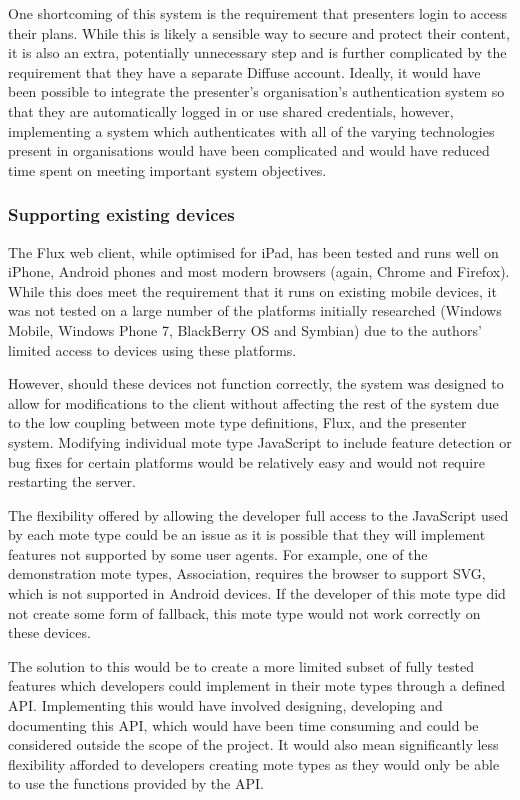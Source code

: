 \documentclass[a4papert,11pt,notitlepage]{article}
\begin{document}
One shortcoming of this system is the requirement that presenters login to access their plans. While this is likely a sensible way to secure and protect their content, it is also an extra, potentially unnecessary step and is further complicated by the requirement that they have a separate Diffuse account. Ideally, it would have been possible to integrate the presenter's organisation's authentication system so that they are automatically logged in or use shared credentials, however, implementing a system which authenticates with all of the varying technologies present in organisations would have been complicated and would have reduced time spent on meeting important system objectives.

\subsubsection{Supporting existing devices}
\label{sec:supportexistingdevices}
The Flux web client, while optimised for iPad, has been tested and runs well on iPhone, Android phones and most modern browsers (again, Chrome and Firefox). While this does meet the requirement that it runs on existing mobile devices, it was not tested on a large number of the platforms initially researched (Windows Mobile, Windows Phone 7, BlackBerry OS and Symbian) due to the authors' limited access to devices using these platforms. 

However, should these devices not function correctly, the system was designed to allow for modifications to the client without affecting the rest of the system due to the low coupling between mote type definitions, Flux, and the presenter system. Modifying individual mote type JavaScript to include feature detection or bug fixes for certain platforms would be relatively easy and would not require restarting the server.

The flexibility offered by allowing the developer full access to the JavaScript used by each mote type could be an issue as it is possible that they will implement features not supported by some user agents. For example, one of the demonstration mote types, Association, requires the browser to support SVG, which is not supported in Android devices. If the developer of this mote type did not create some form of fallback, this mote type would not work correctly on these devices. 

The solution to this would be to create a more limited subset of fully tested features which developers could implement in their mote types through a defined API. Implementing this would have involved designing, developing and documenting this API, which would have been time consuming and could be considered outside the scope of the project. It would also mean significantly less flexibility afforded to developers creating mote types as they would only be able to use the functions provided by the API.
\end{document}
